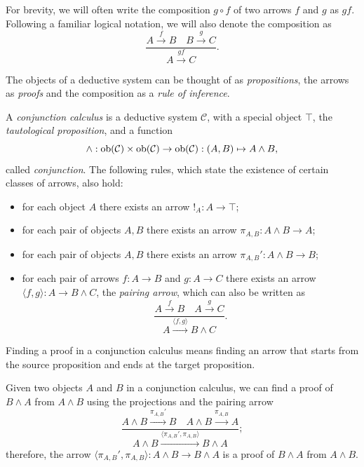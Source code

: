 \begin{notation}
    For brevity, we will often write the composition $g \circ f$ of two arrows $f$ and $g$ as $gf$. Following a familiar logical notation, we will also denote the composition as
    \[ \frac{A \xrightarrow{f} B \quad B \xrightarrow{g} C}{A \xrightarrow{gf} C}. \]
\end{notation}

The objects of a deductive system can be thought of as \emph{propositions}, the arrows as \emph{proofs} and the composition as a \emph{rule of inference}.

\begin{definition}\label{idx:conjunction}
    A \emph{conjunction calculus} is a deductive system $\mathcal C$, with a special object $\top$, the \emph{tautological proposition}, and a function
    \[ \wedge : \operatorname{ob}(\mathcal C)\times\operatorname{ob}(\mathcal C) \to \operatorname{ob}(\mathcal C) : (A,B) \mapsto A\wedge B, \]
    called \emph{conjunction}. The following rules, which state the existence of certain classes of arrows, also hold:
    \begin{itemize}
        \item[(\textnormal{Conj 1})] for each object $A$ there exists an arrow $!_A : A \to \top$;
        \item[(\textnormal{Conj 2a})] for each pair of objects $A,B$ there exists an arrow $\pi_{A,B} : A \wedge B \to A$;
        \item[(\textnormal{Conj 2b})] for each pair of objects $A,B$ there exists an arrow $\pi_{A,B}' : A \wedge B \to B$;
        \item[(\textnormal{Conj 2c})] for each pair of arrows $f : A \to B$ and $g : A \to C$ there exists an arrow $\langle f, g \rangle : A \to B \wedge C$, the \emph{pairing arrow}, which can also be written as
        \[ \frac{A \xrightarrow{f} B \quad A \xrightarrow{g} C}{A \xrightarrow{\langle f, g \rangle} B \wedge C}.
        \]
    \end{itemize}
\end{definition}

Finding a proof in a conjunction calculus means finding an arrow that starts from the source proposition and ends at the target proposition.

\begin{example}
    Given two objects $A$ and $B$ in a conjunction calculus, we can find a proof of $B \land A$ from $A \land B$ using the projections and the pairing arrow
    \[ \frac{A \wedge B \xrightarrow{\pi_{A,B}'} B \quad A \wedge B \xrightarrow{\pi_{A,B}} A}{A \wedge B \xrightarrow{\langle \pi_{A,B}',\pi_{A,B}\rangle} B \wedge A}; \]
    therefore, the arrow $\langle \pi_{A,B}',\pi_{A,B}\rangle : A \wedge B \to B \wedge A$ is a proof of $B \land A$ from $A \land B$.
\end{example}

